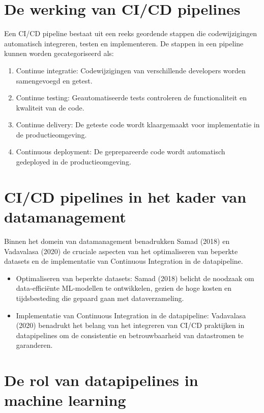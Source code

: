 \section{De werking van CI/CD pipelines}

Een CI/CD pipeline bestaat uit een reeks geordende stappen die codewijzigingen automatisch integreren, testen en implementeren. De stappen in een pipeline kunnen worden gecategoriseerd als:

\begin{enumerate}[label=\arabic*.]
    \item Continue integratie: Codewijzigingen van verschillende developers worden samengevoegd en getest.
    \item Continue testing: Geautomatiseerde tests controleren de functionaliteit en kwaliteit van de code.
    \item Continue delivery: De geteste code wordt klaargemaakt voor implementatie in de productieomgeving.
    \item Continuous deployment: De geprepareerde code wordt automatisch gedeployed in de productieomgeving.
\end{enumerate}

\section{CI/CD pipelines in het kader van datamanagement}

Binnen het domein van datamanagement benadrukken Samad (2018) en Vadavalasa (2020) de cruciale aspecten van het optimaliseren van beperkte datasets en de implementatie van Continuous Integration in de datapipeline.

\begin{itemize}
    \item Optimaliseren van beperkte datasets: Samad (2018) belicht de noodzaak om data-efficiënte ML-modellen te ontwikkelen, gezien de hoge kosten en tijdsbesteding die gepaard gaan met dataverzameling.
    \item Implementatie van Continuous Integration in de datapipeline: Vadavalasa (2020) benadrukt het belang van het integreren van CI/CD praktijken in datapipelines om de consistentie en betrouwbaarheid van datastromen te garanderen.
\end{itemize}

\section{De rol van datapipelines in machine learning}

